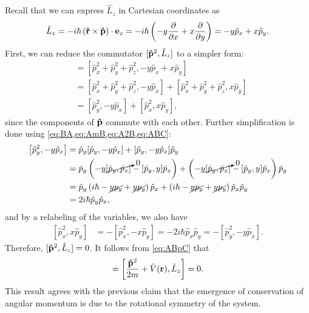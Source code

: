     Recall that we can express $\hat{L}_z$ in Cartesian coordinates as
    \begin{align*}
        \hat{L}_z = -i\hbar \left( \mathbf{\hat{r}}\times\mathbf{\hat{p}} \right)\cdot\mathbf{e}_z = -i\hbar\left( -y\frac{\partial}{\partial x} + x\frac{\partial}{\partial y} \right) =  -y \hat{p}_x + x \hat{p}_y.
    \end{align*}
    First, we can reduce the commutator $[\mathbf{\hat{p}}^2,\hat{L}_z]$ to a simpler form:
    \begin{align*}
        [\vh{p}^2,\hat{L}_z]
            &= \left[ \hat{p}_x^2 + \hat{p}_y^2 + \hat{p}_z^2, -y \hat{p}_x + x \hat{p}_y \right] \\
            &= \left[ \hat{p}_x^2 + \hat{p}_y^2 + \hat{p}_z^2, -y \hat{p}_x \right] + \left[ \hat{p}_x^2 + \hat{p}_y^2 + \hat{p}_z^2, x \hat{p}_y \right] \\
            &= \left[ \hat{p}_y^2, -y \hat{p}_x \right] + \left[ \hat{p}_x^2, x \hat{p}_y \right],
    \end{align*}
    since the components of $\mathbf{\hat{p}}$ commute with each other. Further simplification is done using \cref{eq:BA,eq:AmB,eq:A2B,eq:ABC}:
    \begin{align*}
        \left[ \hat{p}_y^2, -y \hat{p}_x \right]
            &= \hat{p}_y [\hat{p}_y, -y \hat{p}_x ] + [\hat{p}_y, -y \hat{p}_x ]\hat{p}_y \\
            &= \hat{p}_y \left( -y \cancelto{0}{[\hat{p}_y, \hat{p}_x ]} - [\hat{p}_y, y] \hat{p}_x \right) + \left( -y \cancelto{0}{[\hat{p}_y, \hat{p}_x ]} - [\hat{p}_y, y] \hat{p}_x \right)\hat{p}_y \\
            &= \hat{p}_y \left( i\hbar - \cancel{yp_y} + \cancel{yp_y} \right) \hat{p}_x + \left( i\hbar - \cancel{yp_y} + \cancel{yp_y} \right) \hat{p}_x\hat{p}_y \\
            &= 2i\hbar \hat{p}_y \hat{p}_x,
    \end{align*}
    and by a relabeling of the variables, we also have
    \begin{align*}
        \left[ \hat{p}_x^2, x \hat{p}_y \right] &= -\left[ \hat{p}_x^2, -x \hat{p}_y \right] = -2i\hbar \hat{p}_x \hat{p}_y = -\left[ \hat{p}_y^2, -y \hat{p}_x \right].
    \end{align*}
    Therefore, $[\mathbf{\hat{p}}^2,\hat{L}_z] = 0$. It follows from \cref{eq:ABpC} that
    \begin{align*}
        [\hat{H},\hat{L}_z] = \left[ \frac{\vh{p}^2}{2m}  + \hat{V}(\vec{r}), \hat{L}_z \right] = 0.
    \end{align*}
    This result agrees with the previous claim that the emergence of conservation of angular momentum is due to the rotational symmetry of the system.
    
